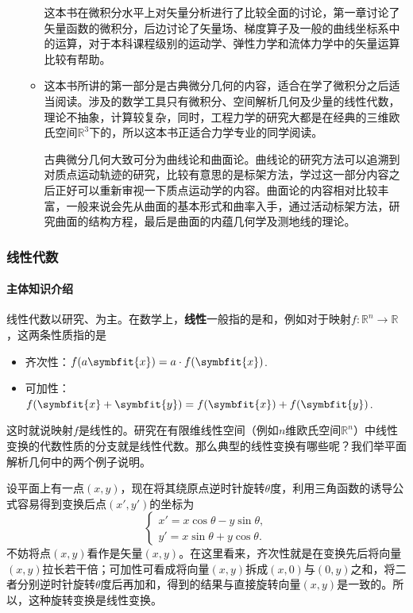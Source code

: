 \begin{itemize}
\begin{itemize}
                    这本书在微积分水平上对矢量分析进行了比较全面的讨论，第一章讨论了矢量函数的微积分，后边讨论了矢量场、梯度算子及一般的曲线坐标系中的运算，对于本科课程级别的运动学、弹性力学和流体力学中的矢量运算比较有帮助。

              \item \textcite[微分几何]{彭家贵2002微分几何}

                    这本书所讲的第一部分是古典微分几何的内容，适合在学了微积分之后适当阅读。涉及的数学工具只有微积分、空间解析几何及少量的线性代数，理论不抽象，计算较复杂，同时，工程力学的研究大都是在经典的三维欧氏空间$\mathbb{R}^3$下的，所以这本书正适合力学专业的同学阅读。

                    古典微分几何大致可分为曲线论和曲面论。曲线论的研究方法可以追溯到对质点运动轨迹的研究，比较有意思的是标架方法，学过这一部分内容之后正好可以重新审视一下质点运动学的内容。曲面论的内容相对比较丰富，一般来说会先从曲面的基本形式和曲率入手，通过活动标架方法，研究曲面的结构方程，最后是曲面的内蕴几何学及测地线的理论。
          \end{itemize}
\end{itemize}

\subsubsection{线性代数}

\paragraph{主体知识介绍}

线性代数以研究、为主。在数学上，\textbf{线性}一般指的是和，例如对于映射$f:\mathbb{R}^n\to\mathbb{R}$，这两条性质指的是

\begin{itemize}
    \item 齐次性：$f(a\symbfit{x})=a\cdot f(\symbfit{x})$.

    \item 可加性：$f(\symbfit{x}+\symbfit{y})=f(\symbfit{x})+ f(\symbfit{y})$.
\end{itemize}
这时就说映射$f$是线性的。研究在有限维线性空间（例如$n$维欧氏空间$\mathbb{R}^n$）中线性变换的代数性质的分支就是线性代数。那么典型的线性变换有哪些呢？我们举平面解析几何中的两个例子说明。

设平面上有一点$(x,y)$，现在将其绕原点逆时针旋转$\theta$度，利用三角函数的诱导公式容易得到变换后点$(x',y')$的坐标为
\[
    \begin{cases}
        x'=x\cos \theta -y\sin \theta, \\
        y'=x\sin \theta +y\cos \theta.
    \end{cases}
\]
不妨将点$(x,y)$看作是矢量$(x,y)$。在这里看来，齐次性就是在变换先后将向量$(x,y)$拉长若干倍；可加性可看成将向量$(x,y)$拆成$(x,0)$与$(0,y)$之和，将二者分别逆时针旋转$\theta$度后再加和，得到的结果与直接旋转向量$(x,y)$是一致的。所以，这种旋转变换是线性变换。

